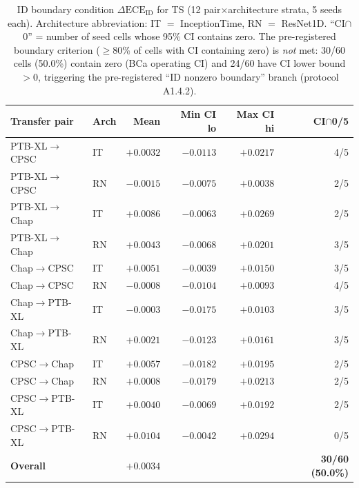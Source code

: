 \documentclass[final,5p,times,nonatbib]{elsarticle}
\begin{document}
\begin{table}[t]
\centering
\caption{ID boundary condition $\Delta\text{ECE}_{\text{ID}}$ for TS
(12 pair$\times$architecture strata, 5 seeds each). Architecture
abbreviation: IT $=$ InceptionTime, RN $=$ ResNet1D. ``CI$\cap$0'' =
number of seed cells whose 95\% CI contains zero. The pre-registered
boundary criterion ($\geq$80\% of cells with CI containing zero) is
\emph{not} met: 30/60 cells (50.0\%) contain zero (BCa operating CI)
and 24/60 have CI lower bound $>0$, triggering the pre-registered
``ID nonzero boundary'' branch (protocol A1.4.2).}
\label{tab:boundary}
\footnotesize
\begin{tabular}{llrrrr}
\toprule
Transfer pair & Arch & Mean & Min CI lo & Max CI hi & CI$\cap$0/5 \\
\midrule
PTB-XL$\rightarrow$CPSC   & IT & $+0.0032$ & $-0.0113$ & $+0.0217$ & 4/5 \\
PTB-XL$\rightarrow$CPSC   & RN & $-0.0015$ & $-0.0075$ & $+0.0038$ & 2/5 \\
PTB-XL$\rightarrow$Chap   & IT & $+0.0086$ & $-0.0063$ & $+0.0269$ & 2/5 \\
PTB-XL$\rightarrow$Chap   & RN & $+0.0043$ & $-0.0068$ & $+0.0201$ & 3/5 \\
Chap$\rightarrow$CPSC     & IT & $+0.0051$ & $-0.0039$ & $+0.0150$ & 3/5 \\
Chap$\rightarrow$CPSC     & RN & $-0.0008$ & $-0.0104$ & $+0.0093$ & 4/5 \\
Chap$\rightarrow$PTB-XL   & IT & $-0.0003$ & $-0.0175$ & $+0.0103$ & 3/5 \\
Chap$\rightarrow$PTB-XL   & RN & $+0.0021$ & $-0.0123$ & $+0.0161$ & 3/5 \\
CPSC$\rightarrow$Chap     & IT & $+0.0057$ & $-0.0182$ & $+0.0195$ & 2/5 \\
CPSC$\rightarrow$Chap     & RN & $+0.0008$ & $-0.0179$ & $+0.0213$ & 2/5 \\
CPSC$\rightarrow$PTB-XL   & IT & $+0.0040$ & $-0.0069$ & $+0.0192$ & 2/5 \\
CPSC$\rightarrow$PTB-XL   & RN & $+0.0104$ & $-0.0042$ & $+0.0294$ & 0/5 \\
\midrule
\textbf{Overall} & & $\mathbf{+0.0034}$ & & & \textbf{30/60 (50.0\%)} \\
\bottomrule
\end{tabular}
\end{table}
\end{document}
